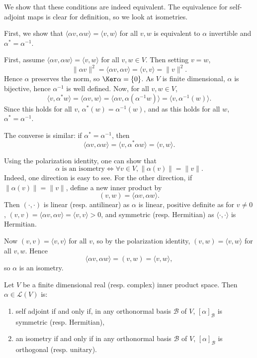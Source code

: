\documentclass[12pt]{article}
\begin{document}
\begin{proofbox}
	We show that these conditions are indeed equivalent. The equivalence for self-adjoint maps is clear for definition, so we look at isometries.

	First, we show that $\langle \alpha v, \alpha w \rangle = \langle v, w \rangle$ for all $v, w$ is equivalent to $\alpha$ invertible and $\alpha^{\ast} = \alpha^{-1}$.

	First, assume $\langle \alpha v, \alpha w \rangle = \langle v, w \rangle$ for all $v, w \in V$. Then setting $v = w$,
	\[
	\|\alpha v\|^2 = \langle \alpha v, \alpha v \rangle = \langle v, v \rangle = \|v\|^2
	.\]
	Hence $\alpha$ preserves the norm, so $\Ker \alpha = \{0\}$. As $V$ is finite dimensional, $\alpha$ is bijective, hence $\alpha^{-1}$ is well defined. Now, for all $v, w \in V$,
	\[
	\langle v, \alpha^{\ast}w \rangle = \langle \alpha v, w \rangle = \langle \alpha v, \alpha(\alpha^{-1} w) \rangle = \langle v, \alpha^{-1}(w)\rangle
	.\]
	Since this holds for all $v$, $\alpha^{\ast}(w) = \alpha^{-1}(w)$, and as this holds for all $w$, $\alpha^{\ast} = \alpha^{-1}$.

	The converse is similar: if $\alpha^{\ast} = \alpha^{-1}$, then
	\[
	\langle \alpha v, \alpha w \rangle = \langle v, \alpha^{\ast} \alpha w \rangle = \langle v, w \rangle
	.\]
\end{proofbox}

\begin{remark}
	Using the polarization identity, one can show that
	\[
		\alpha \text{ is an isometry} \iff \forall v \in V, \|\alpha(v)\| = \|v\|
	.\]
	Indeed, one direction is easy to see. For the other direction, if $\|\alpha(v)\| = \|v\|$, define a new inner product by
	\[
		(v, w) = \langle \alpha v, \alpha w \rangle
	.\]
	Then $(\cdot, \cdot)$ is linear (resp. antilinear) as $\alpha$ is linear, positive definite as for $v \neq 0$, $(v, v) = \langle \alpha v, \alpha v \rangle = \langle v, v \rangle > 0$, and symmetric (resp. Hermitian) as $\langle \cdot, \cdot \rangle$ is Hermitian.

	Now $(v, v) = \langle v, v \rangle$ for all $v$, so by the polarization identity, $(v, w) = \langle v, w \rangle$ for all $v, w$. Hence
	\[
		\langle \alpha v, \alpha w \rangle = (v, w) = \langle v, w \rangle
	,\]
	so $\alpha$ is an isometry.
\end{remark}

\begin{lemma}
	Let $V$ be a finite dimensional real (resp. complex) inner product space. Then $\alpha \in \mathcal{L}(V)$ is:
	\begin{enumerate}[\normalfont(i)]
		\item self adjoint if and only if, in any orthonormal basis $\mathcal{B}$ of $V$, $[\alpha]_{\mathcal{B}}$ is symmetric (resp. Hermitian),
		\item an isometry if and only if in any orthonormal basis $\mathcal{B}$ of $V$, $[\alpha]_{\mathcal{B}}$ is orthogonal (resp. unitary).
	\end{enumerate}
\end{lemma}
\end{document}

